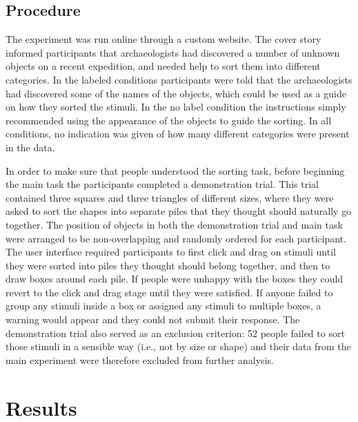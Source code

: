 \documentclass[a4paper, doc]{apa6}
\begin{document}
\subsection{Procedure}

The experiment was run online through a custom website. The cover story informed participants that archaeologists had discovered a number of unknown objects on a recent expedition, and needed help to sort them into different categories. In the labeled conditions participants were told that the archaeologists had discovered some of the names of the objects, which could be used as a guide on how they sorted the stimuli. In the {\sc no label} condition the instructions simply recommended using the appearance of the objects to guide the sorting. In all conditions, no indication was given of how many different categories were present in the data.

In order to make sure that people understood the sorting task, before beginning the main task the participants completed a demonstration trial. This trial contained three squares and three triangles of different sizes, where they were asked to sort the shapes into separate piles that they thought should naturally go together. The position of objects in both the demonstration trial and main task were arranged to be non-overlapping and randomly ordered for each participant. The user interface required participants to first click and drag on stimuli until they were sorted into piles they thought should belong together, and then to draw boxes around each pile. If people were unhappy with the boxes they could revert to the click and drag stage until they were satisfied. If anyone failed to group any stimuli inside a box or assigned any stimuli to multiple boxes, a warning would appear and they could not submit their response. The demonstration trial also served as an exclusion criterion: 52 people failed to sort those stimuli in a sensible way (i.e., not by size or shape) and their data from the main experiment were therefore excluded from further analysis.

\section{Results}
\end{document}
